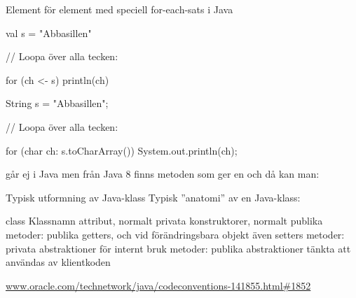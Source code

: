 \begin{Slide}{Element för element med speciell for-each-sats i Java}
\begin{multicols}{2}
\noindent{}
\begin{CodeSmall}[basicstyle=\ttfamily\SlideFontSize{6}{8},backgroundcolor=\color{white},
  frame=none]
val s = "Abbasillen"

// Loopa över alla tecken:

for (ch <- s) {
  println(ch)
}
\end{CodeSmall}

\columnbreak

\noindent{}
\begin{CodeSmall}[language=Java,basicstyle=\ttfamily\SlideFontSize{6}{8},backgroundcolor=\color{white},
  frame=none]
String s = "Abbasillen";

// Loopa över alla tecken:

for (char ch: s.toCharArray()) {
  System.out.println(ch);
}
\end{CodeSmall}
\end{multicols}

\pause
{\noindent\SlideFontSmall
{} går ej i Java men
från Java 8 finns metoden  som ger en  och då kan man: \\
 }
\end{Slide}







\begin{Slide}{Typisk utformning av Java-klass}
Typisk ''anatomi'' av en Java-klass:
\begin{Code}[language=Java]
class Klassnamn {
    attribut, normalt privata
    konstruktorer, normalt publika
    metoder: publika getters, och vid förändringsbara objekt även setters
    metoder: privata abstraktioner för internt bruk
    metoder: publika abstraktioner tänkta att användas av klientkoden
}
\end{Code}
\href{http://www.oracle.com/technetwork/java/codeconventions-141855.html#1852}{www.oracle.com/technetwork/java/codeconventions-141855.html\#1852}
\end{Slide}


